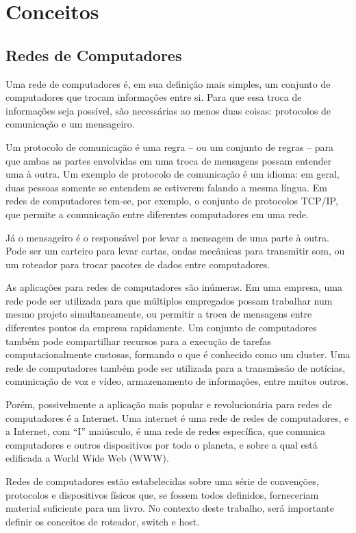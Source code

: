 \chapter{Conceitos}
\label{ch:intro}

\section{Redes de Computadores}
\label{ch:redes}
Uma rede de computadores é, em sua definição mais simples, um conjunto de computadores que trocam informações entre si. Para que essa troca de informações seja possível, são necessárias ao menos duas coisas: protocolos de comunicação e um mensageiro.

Um protocolo de comunicação é uma regra – ou um conjunto de regras – para que ambas as partes envolvidas em uma troca de mensagens possam entender uma à outra. Um exemplo de protocolo de comunicação é um idioma: em geral, duas pessoas somente se entendem se estiverem falando a mesma língua. Em redes de computadores tem-se, por exemplo, o conjunto de protocolos TCP/IP, que permite a comunicação entre diferentes computadores em uma rede.

Já o mensageiro é o responsável por levar a mensagem de uma parte à outra. Pode ser um carteiro para levar cartas, ondas mecânicas para transmitir som, ou um roteador para trocar pacotes de dados entre computadores.

As aplicações para redes de computadores são inúmeras. Em uma empresa, uma rede pode ser utilizada para que múltiplos empregados possam trabalhar num mesmo projeto simultaneamente, ou permitir a troca de mensagens entre diferentes pontos da empresa rapidamente. Um conjunto de computadores também pode compartilhar recursos para a execução de tarefas computacionalmente custosas, formando o que é conhecido como um cluster. Uma rede de computadores também pode ser utilizada para a transmissão de notícias, comunicação de voz e vídeo, armazenamento de informações, entre muitos outros.

Porém, possivelmente a aplicação mais popular e revolucionária para redes de computadores é a Internet. Uma internet é uma rede de redes de computadores, e a Internet, com “I” maiúsculo, é uma rede de redes específica, que comunica computadores e outros dispositivos por todo o planeta, e sobre a qual está edificada a World Wide Web (WWW).

Redes de computadores estão estabelecidas sobre uma série de convenções, protocolos e dispositivos físicos que, se fossem todos definidos, forneceriam material suficiente para um livro. No contexto deste trabalho, será importante definir os conceitos de roteador, switch e host.


